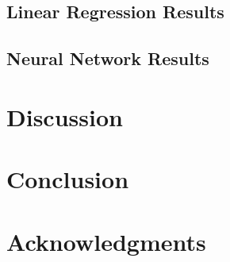 \documentclass[11pt]{article}
\begin{document}
\subsection{Linear Regression Results}

\subsection{Neural Network Results}


\section{Discussion}


\section{Conclusion}


\section*{Acknowledgments}







\end{document}
